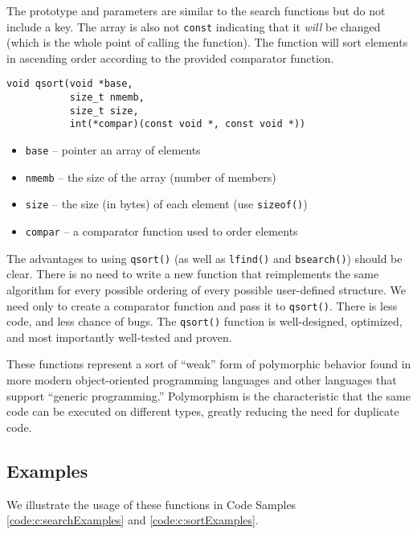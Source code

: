 The prototype and parameters are similar to the search functions but do not
include a key.  The array is also not \texttt{const} indicating that
it \emph{will} be changed (which is the whole point of calling the function).
The function will sort elements in ascending order according to the provided 
comparator function.

\begin{verbatim}
void qsort(void *base, 
           size_t nmemb, 
           size_t size, 
           int(*compar)(const void *, const void *))
\end{verbatim}           

\begin{itemize}
  \item \texttt{base} -- pointer an array of elements
  \item \texttt{nmemb} -- the size of the array (number of members)
  \item \texttt{size} -- the size (in bytes) of each element (use \texttt{sizeof()})
  \item \texttt{compar} -- a comparator function used to order elements
\end{itemize}

The advantages to using \texttt{qsort()} (as well as \texttt{lfind()} 
and \texttt{bsearch()}) should be clear.  There is no need to write a 
new function that reimplements the same algorithm for every possible ordering of
every possible user-defined structure.  We need only to create a comparator
function and pass it to \texttt{qsort()}.  There is less code, and less
chance of bugs.  The \texttt{qsort()} function is well-designed, 
optimized, and most importantly well-tested and proven.

These functions represent a sort of ``weak'' form of  polymorphic behavior found
in more modern object-oriented programming languages and other languages that
support ``generic programming.''  Polymorphism is the characteristic that
the same code can be executed on different types, greatly reducing the need
for duplicate code.

\subsection{Examples}

We illustrate the usage of these functions in Code Samples 
\ref{code:c:searchExamples} and \ref{code:c:sortExamples}.

